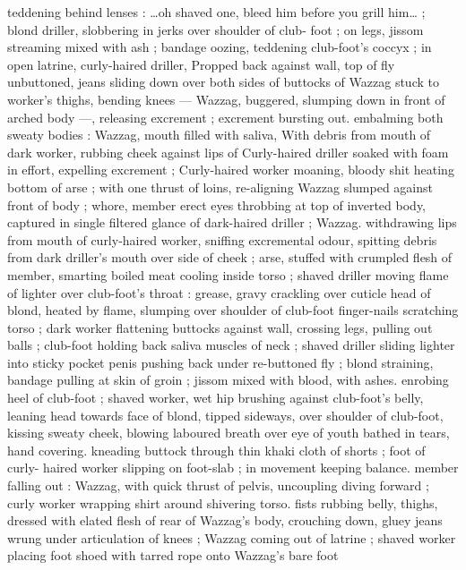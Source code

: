 teddening behind lenses : {\gl}{\ldots}oh shaved one, bleed him before you 
grill him{\ldots}{\gr} ; blond driller, slobbering in jerks over shoulder of club- 
foot ; on legs, jissom streaming mixed with ash ; bandage oozing, 
teddening club-foot's coccyx ; in open latrine, curly-haired driller, 
Propped back against wall, top of fly unbuttoned, jeans sliding down 
over both sides of buttocks of Wazzag stuck to worker's thighs, 
bending knees --- Wazzag, buggered, slumping down in front of 
arched body ---, releasing excrement ; excrement bursting out. 
embalming both sweaty bodies : Wazzag, mouth filled with saliva, 
With debris from mouth of dark worker, rubbing cheek against lips of 
Curly-haired driller soaked with foam in effort, expelling excrement ; 
Curly-haired worker moaning, bloody shit heating bottom of arse ; 
with one thrust of loins, re-aligning Wazzag slumped against front of 
body ; whore, member erect eyes throbbing at top of inverted body, 
captured in single filtered glance of dark-haired driller ; Wazzag. 
withdrawing lips from mouth of curly-haired worker, sniffing 
excremental odour, spitting debris from dark driller's mouth over side 
of cheek ; arse, stuffed with crumpled flesh of member, smarting 
boiled meat cooling inside torso ; shaved driller moving flame of 
lighter over club-foot's throat : grease, gravy crackling over cuticle 
head of blond, heated by flame, slumping over shoulder of club-foot 
finger-nails scratching torso ; dark worker flattening buttocks against 
wall, crossing legs, pulling out balls ; club-foot holding back saliva 
muscles of neck ; shaved driller sliding lighter into sticky pocket 
penis pushing back under re-buttoned fly ; blond straining, bandage 
pulling at skin of groin ; jissom mixed with blood, with ashes. 
enrobing heel of club-foot ; shaved worker, wet hip brushing against 
club-foot's belly, leaning head towards face of blond, tipped 
sideways, over shoulder of club-foot, kissing sweaty cheek, blowing 
laboured breath over eye of youth bathed in tears, hand covering. 
kneading buttock through thin khaki cloth of shorts ; foot of curly- 
haired worker slipping on foot-slab ; in movement keeping balance. 
member falling out : Wazzag, with quick thrust of pelvis, uncoupling 
diving forward ; curly worker wrapping shirt around shivering torso. 
fists rubbing belly, thighs, dressed with elated flesh of rear of 
Wazzag's body, crouching down, gluey jeans wrung under 
articulation of knees ; Wazzag coming out of latrine ; shaved worker 
placing foot shoed with tarred rope onto Wazzag's bare foot 
